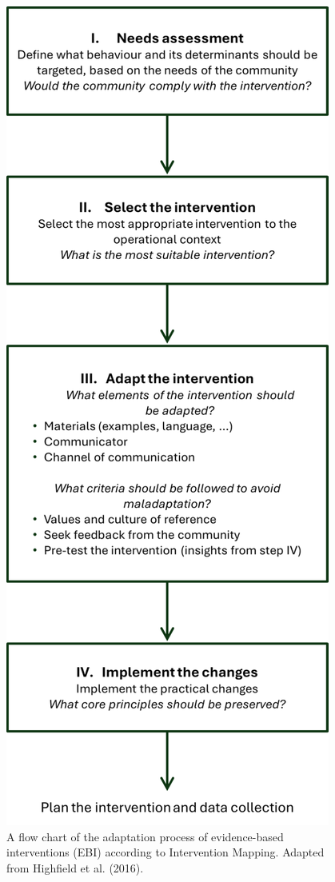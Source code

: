 \documentclass[authordate, reflection]{jote-new-article}
\begin{document}
	\begin{figure}
		\includegraphics[width=\linewidth]{media/image1.png}

		\caption{A flow chart of the adaptation process of evidence-based interventions (EBI) according to Intervention Mapping. Adapted from Highfield et al. (2016).}

		\label{fig:rId8}


	\end{figure}
\end{document}
